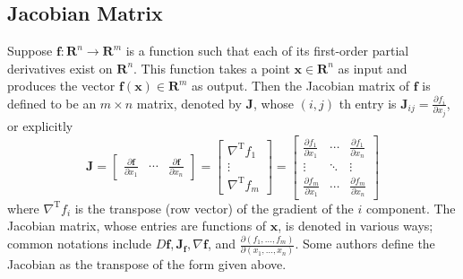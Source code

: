 \documentclass[13pt]{article}
\theoremstyle{definition}
\theoremstyle{remark}
\begin{document}
\subsection{Jacobian Matrix}
Suppose $\mathbf{f}: \mathbf{R}^n \rightarrow \mathbf{R}^m$ is a function such that each of its first-order partial derivatives exist on $\mathbf{R}^n$. This function takes a point $\mathbf{x} \in \mathbf{R}^n$ as input and produces the vector $\mathbf{f}(\mathbf{x}) \in \mathbf{R}^m$ as output. Then the Jacobian matrix of $\mathbf{f}$ is defined to be an $m \times n$ matrix, denoted by $\mathbf{J}$, whose $(i, j)$ th entry is $\mathbf{J}_{i j}=\frac{\partial f_i}{\partial x_j}$, or explicitly
$$
\mathbf{J}=\left[\begin{array}{ccc}
\frac{\partial \mathbf{f}}{\partial x_1} & \cdots & \frac{\partial \mathbf{f}}{\partial x_n}
\end{array}\right]=\left[\begin{array}{c}
\nabla^{\mathrm{T}} f_1 \\
\vdots \\
\nabla^{\mathrm{T}} f_m
\end{array}\right]=\left[\begin{array}{ccc}
\frac{\partial f_1}{\partial x_1} & \cdots & \frac{\partial f_1}{\partial x_n} \\
\vdots & \ddots & \vdots \\
\frac{\partial f_m}{\partial x_1} & \cdots & \frac{\partial f_m}{\partial x_n}
\end{array}\right]
$$
where $\nabla^{\mathrm{T}} f_i$ is the transpose (row vector) of the gradient of the $i$ component.
The Jacobian matrix, whose entries are functions of $\mathbf{x}$, is denoted in various ways; common notations include $ D \mathbf{f}, \mathbf{J}_{\mathbf{f}}, \nabla \mathbf{f}$, and $\frac{\partial\left(f_1, \ldots, f_m\right)}{\partial\left(x_1, \ldots, x_n\right)}$. Some authors define the Jacobian as the transpose of the form given above.
\end{document}
